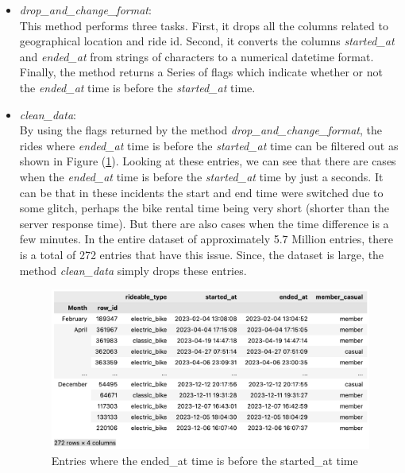 \documentclass[12pt]{article}
\begin{document}
\begin{itemize}
	\item \textit{drop\_and\_change\_format}:\\
	  This method performs three tasks. First, it drops all the columns related to geographical location and ride id. Second, it converts the columns \textit{started\_at} and \textit{ended\_at} from strings of characters to a numerical datetime format. Finally, the method returns a Series of flags which indicate whether or not the \textit{ended\_at} time is before the \textit{started\_at} time. 
	  
	  \item \textit{clean\_data}:\\
	  By using the flags returned by the method \textit{drop\_and\_change\_format}, the rides where \textit{ended\_at} time is before the \textit{started\_at} time can be filtered out as shown in Figure (\ref{fig8}). Looking at these entries, we can see that there are cases when the \textit{ended\_at} time is before the \textit{started\_at} time by just a seconds. It can be that in these incidents the start and end time were switched due to some glitch, perhaps the bike rental time being very short (shorter than the server response time). But there are also cases when the time difference is a few minutes. In the entire dataset of approximately 5.7 Million entries, there is a total of 272 entries that have this issue. Since, the dataset is large, the method \textit{clean\_data} simply drops these entries. \\

	\begin{figure}[h]
	\centering
	\includegraphics[scale=0.6]{imgNEG.png}
	\caption{Entries where the ended\_at time is before the started\_at time}
	\label{fig8}
	\end{figure}
	
	\end{itemize}
	
\end{document}
